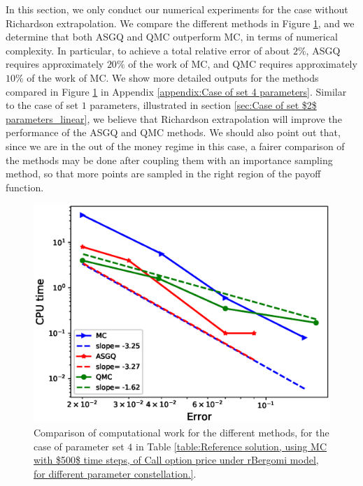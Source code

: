 In this section, we only conduct our numerical experiments for the case without Richardson extrapolation.  We compare the different methods  in Figure \ref{fig:Complexity plot for MC and MISC for Case set $5$ parameters}, and we determine that both ASGQ and QMC outperform MC, in terms of numerical complexity. In particular,  to achieve a total relative error of about $2\%$, ASGQ  requires	approximately $20\%$ of the work of MC, and  QMC requires approximately $10\%$ of the work of MC. We show more detailed outputs for the methods compared in Figure \ref{fig:Complexity plot for MC and MISC for Case set $5$ parameters} in Appendix \ref{appendix:Case of set 4 parameters}.   Similar to the case of set $1$ parameters, illustrated in section \ref{sec:Case of set $2$ parameters_linear}, we believe that Richardson extrapolation will improve the performance of the ASGQ and QMC methods.   We should also point out that, since we are in the out of the money regime in this case, a fairer comparison of the methods may be done after coupling them with an importance sampling method, so that more points are sampled in the right region of the payoff function.
\FloatBarrier
	\begin{figure}[h!]
	\centering
	\includegraphics[width=0.4\linewidth]{./figures/rBergomi_Complexity_rates/set7/error_vs_time_set7_full_comparison}
	
	\caption{Comparison of computational work for the different methods, for the case of parameter set $4$ in Table \ref{table:Reference solution, using MC with $500$ time steps, of Call option price under rBergomi model, for different parameter constellation.}.}
	\label{fig:Complexity plot for MC and MISC for Case set $5$ parameters}
\end{figure}
\FloatBarrier






